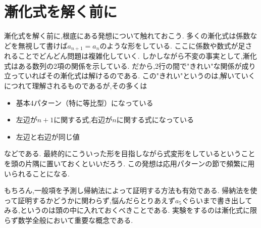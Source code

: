 
\section{漸化式を解く前に}\label{sec:before}
漸化式を解く前に,根底にある発想について触れておこう.
多くの漸化式は係数などを無視して書けば$a_{n+1}=a_n$のような形をしている.
ここに係数や数式が足されることでどんどん問題は複雑化していく.
しかしながら不変の事実として,漸化式はある数列の2項の関係を示している.
だから,2行の間で"きれい"な関係が成り立っていればその漸化式は解けるのである.
この"きれい"というのは,解いていくにつれて理解されるものであるが,その多くは
\begin{itemize}
  \item 基本4パターン（特に等比型）になっている
  \item 左辺が$n+1$に関する式,右辺が$n$に関する式になっている
  \item 左辺と右辺が同じ値
\end{itemize}
などである.
最終的にこういった形を目指しながら式変形をしているということを頭の片隅に置いておくといいだろう.
この発想は応用パターンの節で頻繁に用いられることになる.

もちろん,一般項を予測し帰納法によって証明する方法も有効である.
帰納法を使って証明するかどうかに関わらず,悩んだらとりあえず$a_5$ぐらいまで書き出してみる,というのは頭の中に入れておくべきことである.
実験をするのは漸化式に限らず数学全般において重要な概念である.
